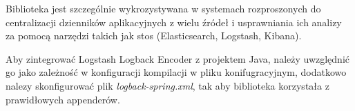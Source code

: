 Biblioteka jest szczególnie wykrozystywana w systemach rozproszonych do centralizacji dzienników aplikacyjnych z wielu źródeł i usprawniania ich analizy za pomocą narzędzi takich jak stos  (Elasticsearch, Logstash, Kibana)\cite{logstashLogbackEncoderOverview}.

Aby zintegrować Logstash Logback Encoder z projektem Java, należy uwzględnić go jako zależność w konfiguracji kompilacji w pliku konifugracyjnym, dodatkowo nalezy skonfigurować plik \textit{logback-spring.xml}, tak aby biblioteka korzystała z prawidłowych appenderów\cite{logstashLogbackEncoderOverview}.